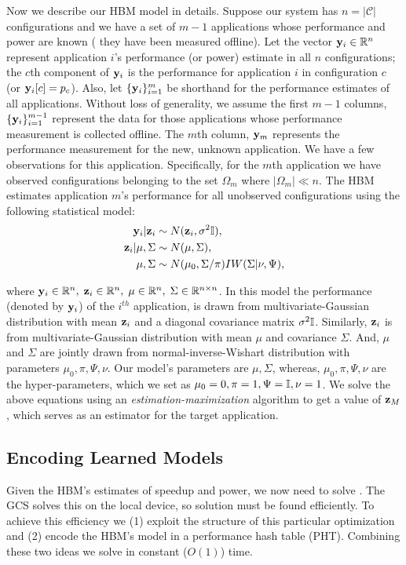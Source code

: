Now we describe our HBM model in details. Suppose our system has $n = |\mathcal{C}|$ configurations and we have a set of $m-1$
applications whose performance and power are known (\ie{} they have
been measured offline). Let the vector $\mathbf{y}_i \in \mathbb{R}^{n}$ represent
application $i$'s performance (or power) estimate in all $n$
configurations; \ie{} the $c$th component of $\mathbf{y}_i$ is the performance for
application $i$ in configuration $c$ (or $\mathbf{y}_i[c] = p_c$).  Also, let
$\{\mathbf{y}_i\}_{i =1}^m$ be shorthand for the performance estimates of all
applications.  Without loss of generality, we assume the first $m-1$
columns, \ie{} $\{\mathbf{y}_i\}_{i =1}^{m-1}$ represent the data for those
applications whose performance measurement is collected offline.  The $m$th
column, $\mathbf{y}_m$ represents the performance measurement for the new, unknown
application.  We have a few observations for this application.
Specifically, for the $m$th application we have observed
configurations belonging to the set $\Omega_m$ where $|\Omega_m| \ll
n$.  The HBM estimates application $m$'s performance for all unobserved
configurations using the following statistical model:
\begin{equation}
\begin{aligned}
\mathbf{y}_i \vert \mathbf{z}_i  &\sim N( \mathbf{z}_i, \sigma^2 \mathbb{I}),\\
\mathbf{z}_i \vert \mu,\Sigma &\sim N(\mu, \Sigma),\\
\mu, \Sigma &\sim N(\mu_0,\Sigma / \pi)IW(\Sigma | \nu, \Psi),
\end{aligned}
\label{eq:HBN}
\end{equation}

where $\mathbf{y}_i \in \mathbb{R}^n, \; \mathbf{z}_i \in \mathbb{R}^n, \; \mu \in \mathbb{R}^{n}, \; \Sigma
\in \mathbb{R}^{n\times n}$. In this model the performance (denoted by $\mathbf{y}_i$) of
the $i^{th}$ application, is drawn from multivariate-Gaussian
distribution with mean $\mathbf{z}_i$ and a diagonal covariance matrix
$\sigma^2\mathbb{I}$.  Similarly, $\mathbf{z}_i$ is from multi\-variate-Gaussian
distribution with mean $\mu$ and covariance $\Sigma$. And, $\mu$ and
$\Sigma$ are jointly drawn from normal-inverse-Wishart distribution
with parameters $\mu_0, \pi,\Psi, \nu$.  Our model's parameters are
$\mu,\Sigma$, whereas, $\mu_0, \pi,\Psi, \nu$ are the
hyper-para\-meters, which we set as $\mu_0 = 0, \pi = 1,\Psi = \mathbb{I}, \nu =
1$.  We solve the above equations using an
\emph{estimation-maximization} algorithm to get a value of $\mathbf{z}_M$,
which serves as an estimator for the target application.




\subsection{Encoding Learned Models}
Given the HBM's estimates of speedup and power, we now need to solve
.  The GCS solves this on the local device, so
solution must be found efficiently.  To achieve this efficiency we (1)
exploit the structure of this particular optimization and (2) encode
the HBM's model in a performance hash table (PHT).  Combining these
two ideas we solve  in constant ($O(1)$) time.

